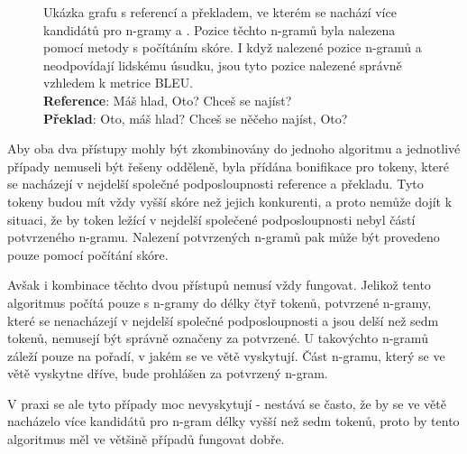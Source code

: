 \begin{figure}[h!]

	\caption{
		Ukázka grafu s referencí a překladem, ve kterém se nachází více kandidátů pro \mbox{n-gramy}  a \uv{,}.
		Pozice těchto \mbox{n-gramů} byla nalezena pomocí metody s počítáním skóre.
		I když nalezené pozice \mbox{n-gramů}  a \uv{,} neodpovídají lidskému úsudku,
		jsou tyto pozice nalezené správně vzhledem k metrice BLEU. \\
		\textbf{Reference}: Máš hlad, Oto? Chceš se najíst?\\
		\textbf{Překlad}: Oto, máš hlad? Chceš se něčeho najíst, Oto?
	}
	\label{img:graph-6}
\end{figure}
  
Aby oba dva přístupy mohly být zkombinovány do jednoho algoritmu a
  jednotlivé případy nemuseli být řešeny odděleně,
  byla přídána bonifikace pro tokeny,
  které se nacházejí v nejdelší společné podposloupnosti reference a překladu.
Tyto tokeny budou mít vždy vyšší skóre než jejich konkurenti,
  a proto nemůže dojít k situaci,
  že by token ležící v nejdelší společené podposloupnosti nebyl částí potvrzeného \mbox{n-gramu}.
Nalezení potvrzených \mbox{n-gramů} pak může být provedeno pouze pomocí počítání skóre.


Avšak i kombinace těchto dvou přístupů nemusí vždy fungovat.
Jelikož tento algoritmus počítá pouze s \mbox{n-gramy} do délky čtyř tokenů,
  potvrzené \mbox{n-gramy},
  které se nenacházejí v nejdelší společné podposloupnosti a jsou delší než sedm tokenů,
  nemusejí být správně označeny za potvrzené.
U takovýchto \mbox{n-gramů} záleží pouze na pořadí, v jakém se ve větě vyskytují.
Část \mbox{n-gramu},
  který se ve větě vyskytne dříve,
  bude prohlášen za potvrzený \mbox{n-gram}.

V praxi se ale tyto případy moc nevyskytují -
  nestává se často, že by se ve větě nacházelo více kandidátů pro \mbox{n-gram} délky vyšší než sedm tokenů,
  proto by tento algoritmus měl ve většině případů fungovat dobře.



